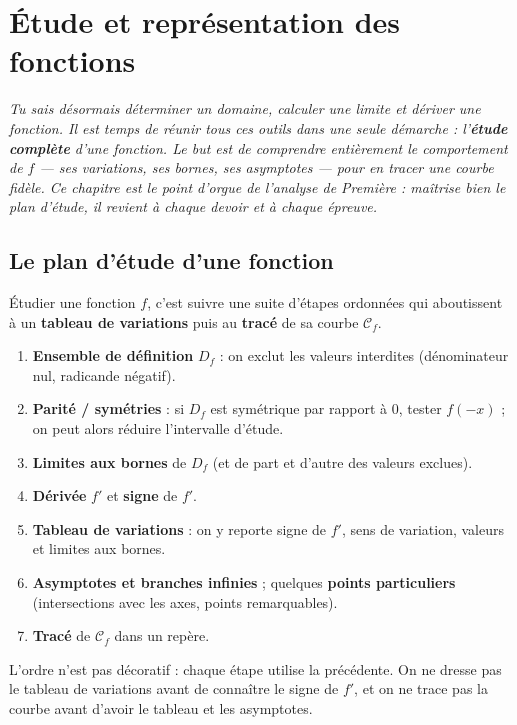 \chapter{Étude et représentation des fonctions}
\textit{Tu sais désormais déterminer un domaine, calculer une limite et dériver une
fonction. Il est temps de réunir tous ces outils dans une seule démarche : l'\textbf{étude
complète} d'une fonction. Le but est de comprendre entièrement le comportement de $f$ —
ses variations, ses bornes, ses asymptotes — pour en tracer une courbe fidèle. Ce
chapitre est le point d'orgue de l'analyse de Première : maîtrise bien le \emph{plan
d'étude}, il revient à chaque devoir et à chaque épreuve.}

\section{Le plan d'étude d'une fonction}

Étudier une fonction $f$, c'est suivre une suite d'étapes ordonnées qui aboutissent à
un \textbf{tableau de variations} puis au \textbf{tracé} de sa courbe $\mathcal{C}_f$.

\begin{aretenir}
\begin{enumerate}
  \item \textbf{Ensemble de définition} $D_f$ : on exclut les valeurs interdites
        (dénominateur nul, radicande négatif).
  \item \textbf{Parité / symétries} : si $D_f$ est symétrique par rapport à $0$,
        tester $f(-x)$ ; on peut alors réduire l'intervalle d'étude.
  \item \textbf{Limites aux bornes} de $D_f$ (et de part et d'autre des valeurs exclues).
  \item \textbf{Dérivée} $f'$ et \textbf{signe} de $f'$.
  \item \textbf{Tableau de variations} : on y reporte signe de $f'$, sens de variation,
        valeurs et limites aux bornes.
  \item \textbf{Asymptotes et branches infinies} ; quelques \textbf{points particuliers}
        (intersections avec les axes, points remarquables).
  \item \textbf{Tracé} de $\mathcal{C}_f$ dans un repère.
\end{enumerate}
\end{aretenir}

\begin{remarque}
L'ordre n'est pas décoratif : chaque étape utilise la précédente. On ne dresse pas le
tableau de variations avant de connaître le signe de $f'$, et on ne trace pas la courbe
avant d'avoir le tableau et les asymptotes.
\end{remarque}

